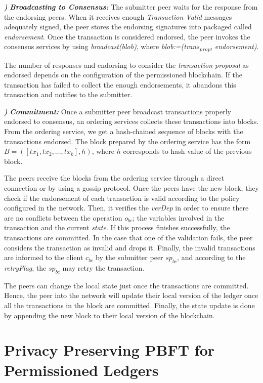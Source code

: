 \documentclass[conference]{IEEEtran}
\newcounter{paranum}
\newcommand{\Par}{\vspace{10pt}\noindent\textbf{\refstepcounter{paranum}\theparanum}\textbf\textit) }
\begin{document}
\Par{\textit{\textbf{Broadcasting to Consensus:}}} The submitter peer waits for the response from the endorsing peers. When it receives enough \textit{Transaction Valid} messages adequately signed, the peer stores the endorsing signatures into packaged called \textit{endorsement}. Once the transaction is considered endorsed, the peer invokes the consensus services by using \textit{broadcast(blob)}, where \textit{blob:=(trans\textsubscript{prop}}, \textit{endorsement)}.

The number of responses and endorsing to consider the \textit{transaction proposal} as endorsed depends on the configuration of the permissioned blockchain. If the transaction has failed to collect the enough endorsements, it abandons this transaction and notifies to the submitter.

\Par{\textit{\textbf{Commitment:}}} Once a submitter peer broadcast transactions properly endorsed to consensus, an ordering services collects these transactions into blocks. From the ordering service, we get a hash-chained sequence of blocks with the transactions endorsed. The block prepared by the ordering service has the form $B=\left(\left[tx_1,tx_2,...,tx_k\right],h\right)$, where $h$ corresponds to hash value of the previous block.

The peers receive the blocks from the ordering service through a direct connection or by using a gossip protocol. Once the peers have the new block, they  check if the endorsement of each transaction is valid according to the policy configured in the network. Then, it verifies the \textit{verDep} in order to ensure there are no conflicts between the operation $o_{bc}$; the variables involved in the transaction and the current \textit{state}. If this process finishes successfully, the transactions are committed. In the case that one of the validation fails, the peer considers the transaction as invalid and drops it. Finally, the invalid transactions are informed to the client $c_{bc}$ by the submitter peer $sp_{bc}$, and according to the \textit{retryFlag}, the $sp_{bc}$ may retry the transaction.

The peers can change the local state just once the transactions are committed. Hence, the peer into the network will update their local version of the ledger once all the transactions in the block are committed. Finally, the state update is done by appending the new block to their local version of the blockchain.

\section{Privacy Preserving PBFT for Permissioned Ledgers}\label{PPPBFT}
\end{document}

